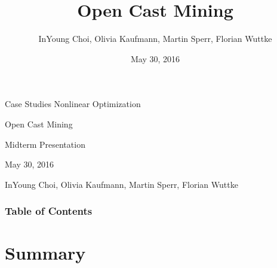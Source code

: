\documentclass{beamer}
\title[Kurzform]{Open Cast Mining}
\author{InYoung Choi, Olivia Kaufmann, Martin Sperr, Florian Wuttke}
\date{May 30, 2016}
\begin{document}

\begin{frame}[c]
	\begin{center}
		\large{Case Studies Nonlinear Optimization}
	\end{center}
	\vspace{0.5cm}
	\begin{center}
		\Huge{\textcolor{TUMblau2}{Open Cast Mining}}
	\end{center}
	\begin{center}
		\large{Midterm Presentation}
	\end{center}
	\vspace{0.5cm}
	\begin{center}
		May 30, 2016
	\end{center}
	\vspace{0.5cm}
	\begin{center}
		\small{InYoung Choi, Olivia Kaufmann, Martin Sperr, Florian Wuttke}
	\end{center}
\end{frame}

\begin{frame}[c]
	\frametitle{Table of Contents}
	\tableofcontents
\end{frame}





%




\section{Summary}
\end{document}

